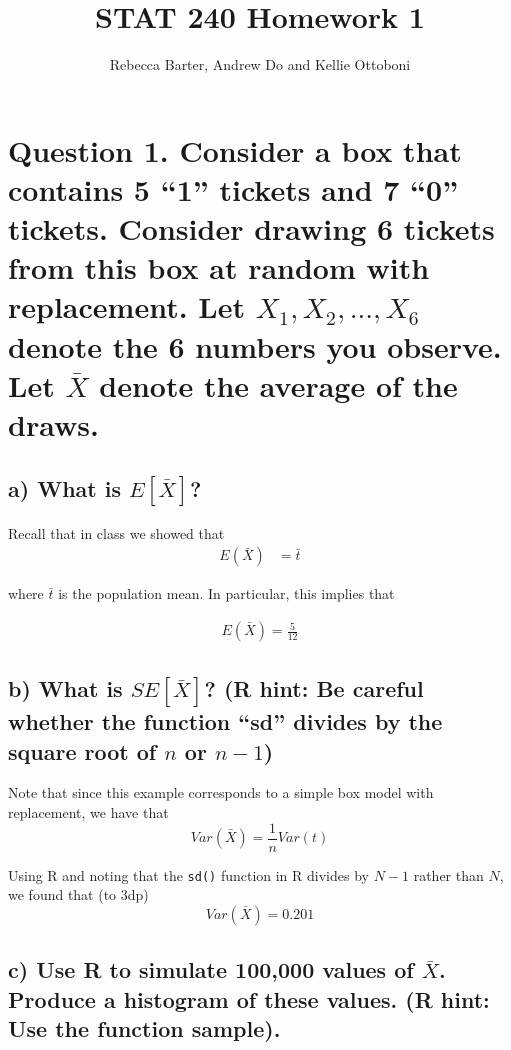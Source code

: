 \documentclass[11pt]{article}\usepackage[]{graphicx}\usepackage[]{color}
\title{STAT 240 Homework 1}
\author{Rebecca Barter, Andrew Do and Kellie Ottoboni}
\begin{document}
\maketitle

 
 \section*{Question 1. Consider a box that contains 5 ``1'' tickets and 7 ``0'' tickets. Consider drawing 6 tickets from this box at random with replacement. Let $X_1, X_2, ..., X_6$ denote the 6 numbers you observe. Let $\bar{X}$ denote the average of the draws.}
 
 \subsection*{a) What is $E[\bar{X}]$?}
 \vspace{5mm}
 \noindent Recall that in class we showed that
 \begin{align*}
 E(\bar{X}) &= \bar{t}
 \end{align*}
 
 \noindent where $\bar{t}$ is the population mean. In particular, this implies that
 
\begin{align*}
E(\bar{X})= \frac{5}{12}
 \end{align*}
 
 
 \vspace{5mm}
 \subsection*{b) What is $SE[\bar{X}]$? (R hint: Be careful whether the function ``sd'' divides by the square root of $n$ or $n - 1$)}
  \vspace{5mm}
 \noindent Note that since this example corresponds to a simple box model with replacement, we have that
 $$Var(\bar{X}) = \frac1n Var(t)$$
 
 
 \noindent Using R and noting that the \texttt{sd()} function in R divides by $N-1$ rather than $N$, we found that (to 3dp)
 $$Var(\bar{X}) = 0.201$$
 

  \vspace{5mm}
 \subsection*{c) Use R to simulate 100,000 values of $\bar{X}$. Produce a histogram of these values. (R hint: Use the function sample).}
 
\end{document}
